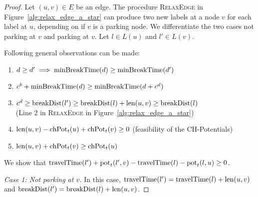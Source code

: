 \begin{proof}
	Let $(u,v) \in E$ be an edge. The procedure \textsc{RelaxEdge} in Figure~\ref{alg:relax_edge_a_star} can produce two new labels at a node $v$ for each label at $u$, depending on if $v$ is a parking node. We differentiate the two cases not parking at $v$ and parking at $v$. Let $l \in L(u)$ and $l' \in L(v)$.

	Following general observations can be made:

	\begin{enumerate}
		\item $d \ge d' \implies \operatorname{minBreakTime}(d) \ge \operatorname{minBreakTime}(d')$
		\item $c^b + \operatorname{minBreakTime}(d) \ge \operatorname{minBreakTime}(d + c^d)$
		\item $c^d \ge \operatorname{breakDist}(l') \ge \operatorname{breakDist}(l) + \operatorname{len}(u,v) \ge \operatorname{breakDist}(l)$\\(Line $2$ in \textsc{RelaxEdge} in Figure~\ref{alg:relax_edge_a_star})
		\item   $\operatorname{len}(u,v) - \operatorname{chPot}_t(u)+ \operatorname{chPot}_t(v) \ge 0$ (feasibility of the CH-Potentials)
		\item  $\operatorname{len}(u,v) + \operatorname{chPot}_t(v) \ge \operatorname{chPot}_t(u)$
	\end{enumerate}

	We show that $\operatorname{travelTime}(l') + \operatorname{pot}_t(l',v) - \operatorname{travelTime}(l) - \operatorname{pot}_t(l,u) \ge 0$.

	\emph{Case 1: Not parking at $v$.} In this case, $\operatorname{travelTime}(l') = \operatorname{travelTime}(l) + \operatorname{len}(u,v)$ and $\operatorname{breakDist}(l') = \operatorname{breakDist}(l) + \operatorname{len}(u,v)$.


\end{proof}
